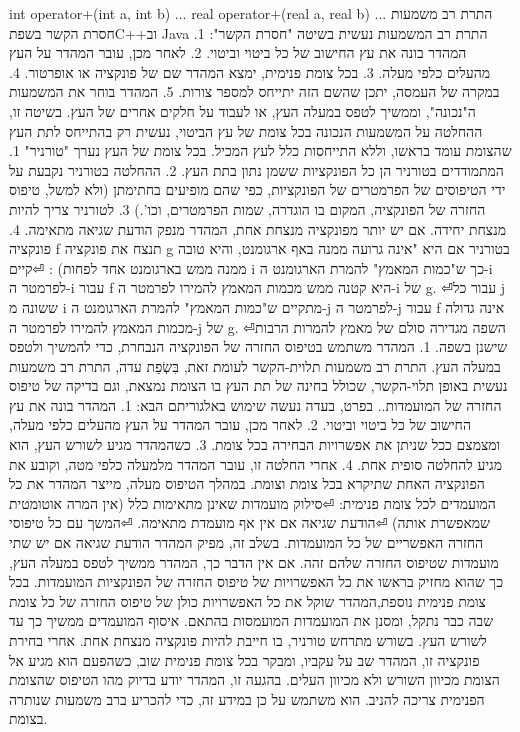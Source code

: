 \begin{טבלא}[!htbp]
      int operator+(int a, int b) {...}
      real operator+(real a, real b) {...}
      התרת רב משמעות חסרת הקשר
      בשפתC++וב Java התרת רב המשמעות נעשית בשיטה "חסרת הקשר":
      1. המהדר בונה את עץ החישוב של כל ביטוי וביטוי.
      2. לאחר מכן, עובר המהדר על העץ מהעלים כלפי מעלה.
      3. בכל צומת פנימית, ימצא המהדר שם של פונקציה או אופרטור.
      4. במקרה של העמסה, יתכן שהשם הזה יתייחס למספר צורות.
      5. המהדר בוחר את המשמעות ה"נכונה", וממשיך לטפס במעלה העץ, או לעבוד על חלקים אחרים של העץ.
      בשיטה זו, ההחלטה על המשמעות הנכונה בכל צומת של עץ הביטוי, נעשית רק בהתייחס לתת העץ שהצומת עומד בראשו, וללא התייחסות כלל לעץ המכיל. בכל צומת של העץ נערך "טורניר"
      1. המתמודדים בטורניר הן כל הפונקציות ששמן נתון בתת העץ.
      2. ההחלטה בטורניר נקבעת על ידי הטיפוסים של הפרמטרים של הפונקציות, כפי שהם מופיעים בחתימתן (ולא למשל, טיפוס החזרה של הפונקציה, המקום בו הוגדרה, שמות הפרמטרים, וכו'.)
      3. לטורניר צריך להיות מנצחת יחידה. אם יש יותר מפונקציה מנצחת אחת, המהדר מנפק הודעת שגיאה מתאימה.
      4. פונקציה f תנצח את פונקציה g בטורניר אם היא "אינה גרועה ממנה באף ארגומנט, והיא טובה ממנה ממש בארגומנט אחד לפחות) :
⏎קיים i כך ש"כמות המאמץ" להמרת הארגומנט ה-i לפרמטר ה-i עבור f היא קטנה ממש מכמות המאמץ להמירו לפרמטר ה-i של g.
⏎עבור כל j ששונה מ i מתקיים ש"כמות המאמץ" להמרת הארגומנט ה-j לפרמטר ה-j עבור f אינה גדולה מכמות המאמץ להמירו לפרמטר ה-j של g.
⏎השפה מגדירה סולם של מאמץ להמרות הרבות שישנן בשפה.
      1. המהדר משתמש בטיפוס החזרה של הפונקציה הנבחרת, כדי להמשיך ולטפס במעלה העץ.
      התרת רב משמעות תלוית-הקשר
      לעומת זאת, בִּשְׂפַת עדה, התרת רב משמעות נעשית באופן תלוי-הקשר, שכולל בחינה של תת העץ בו הצומת נמצאת, וגם בדיקה של טיפוס החזרה של המועמדות.. בפרט, בעדה נעשה שימוש באלגוריתם הבא:
      1. המהדר בונה את עץ החישוב של כל ביטוי וביטוי.
      2. לאחר מכן, עובר המהדר על העץ מהעלים כלפי מעלה, ומצמצם ככל שניתן את אפשרויות הבחירה בכל צומת.
      3. כשהמהדר מגיע לשורש העץ, הוא מגיע להחלטה סופית אחת.
      4. אחרי החלטה זו, עובר המהדר מלמעלה כלפי מטה, וקובע את הפונקציה האחת שתיקרא בכל צומת וצומת.
      במהלך הטיפוס מעלה, מייצר המהדר את כל המועמדים לכל צומת פנימית:
⏎סילוק מועמדות שאינן מתאימות כלל (אין המרה אוטומטית שמאפשרת אותה)
⏎הודעת שגיאה אם אין אף מועמדת מתאימה.
⏎המשך עם כל טיפוסי החזרה האפשריים של כל המועמדות.
      בשלב זה, מפיק המהדר הודעת שגיאה אם יש שתי מועמדות שטיפוס החזרה שלהם זהה. אם אין הדבר כך, המהדר ממשיך לטפס במעלה העץ, כך שהוא מחזיק בראשו את כל האפשרויות של טיפוס החזרה של הפונקציות המועמדות. בכל צומת פנימית נוספת,המהדר שוקל את כל האפשרויות כולן של טיפוס החזרה של כל צומת שבה כבר נתקל, ומסנן את המועמדות המועמסות בהתאם.
      איסוף המועמדים ממשיך כך עד לשורש העץ. בשורש מתרחש טורניר, בו חייבת להיות פונקציה מנצחת אחת. אחרי בחירת פונקציה זו, המהדר שב על עקביו, ומבקר בכל צומת פנימית שוב, כשהפעם הוא מגיע אל הצומת מכיוון השורש ולא מכיוון העלים. בהגעה זו, המהדר יודע בדיוק מהו הטיפוס שהצומת הפנימית צריכה להניב. הוא משתמש על כן במידע זה, כדי להכריע ברב משמעות שנותרה בצומת.

\end{טבלא}
